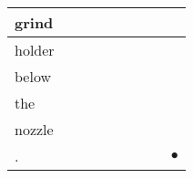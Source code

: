 \documentclass[landscape]{article}
\newcommand{\ssp}{\hspace{2pt}}
\newcommand{\mex}{\cellcolor{g}$\bullet$}
\begin{document}
\begin{tabular}{|l|p{10pt}|p{10pt}|p{10pt}|p{10pt}|p{10pt}|p{10pt}|p{10pt}|p{10pt}|}
\hline
\ssp grind \ssp&\hspace{2pt}&\hspace{2pt}&\hspace{2pt}&\hspace{2pt}&\hspace{2pt}&\hspace{2pt}&\hspace{2pt}&\hspace{2pt}\\
\hline
\ssp holder \ssp&\hspace{2pt}&\hspace{2pt}&\hspace{2pt}&\hspace{2pt}&\hspace{2pt}&\hspace{2pt}&\hspace{2pt}&\hspace{2pt}\\
\hline
\ssp below \ssp&\hspace{2pt}&\hspace{2pt}&\hspace{2pt}&\hspace{2pt}&\hspace{2pt}&\hspace{2pt}&\hspace{2pt}&\hspace{2pt}\\
\hline
\ssp the \ssp&\hspace{2pt}&\hspace{2pt}&\hspace{2pt}&\hspace{2pt}&\hspace{2pt}&\hspace{2pt}&\hspace{2pt}&\hspace{2pt}\\
\hline
\ssp nozzle \ssp&\hspace{2pt}&\hspace{2pt}&\hspace{2pt}&\hspace{2pt}&\hspace{2pt}&\hspace{2pt}&\hspace{2pt}&\hspace{2pt}\\
\hline
\ssp \cellcolor{ref7}. \ssp&\hspace{2pt}&\hspace{2pt}&\hspace{2pt}&\hspace{2pt}&\hspace{2pt}&\hspace{2pt}&\hspace{2pt}&\hspace{2pt}\mex\\
\hline
\end{tabular}
\end{document}
